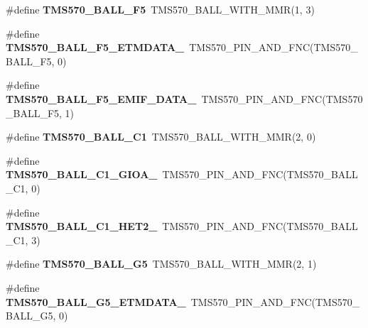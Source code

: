 \begin{DoxyCompactItemize}
\#define {\bfseries T\+M\+S570\+\_\+\+B\+A\+L\+L\+\_\+\+F5}~T\+M\+S570\+\_\+\+B\+A\+L\+L\+\_\+\+W\+I\+T\+H\+\_\+\+M\+MR(1, 3)
\item 
\mbox{\label{tms570ls3137zwt-pins_8h_a7a4157873929e40b849c076693bb7411}} 
\#define {\bfseries T\+M\+S570\+\_\+\+B\+A\+L\+L\+\_\+\+F5\+\_\+\+E\+T\+M\+D\+A\+T\+A\+\_}~T\+M\+S570\+\_\+\+P\+I\+N\+\_\+\+A\+N\+D\+\_\+\+F\+NC(T\+M\+S570\+\_\+\+B\+A\+L\+L\+\_\+\+F5, 0)
\item 
\mbox{\label{tms570ls3137zwt-pins_8h_a11a0775932905eaeb8c8e3eaf5fbbd63}} 
\#define {\bfseries T\+M\+S570\+\_\+\+B\+A\+L\+L\+\_\+\+F5\+\_\+\+E\+M\+I\+F\+\_\+\+D\+A\+T\+A\+\_}~T\+M\+S570\+\_\+\+P\+I\+N\+\_\+\+A\+N\+D\+\_\+\+F\+NC(T\+M\+S570\+\_\+\+B\+A\+L\+L\+\_\+\+F5, 1)
\item 
\mbox{\label{tms570ls3137zwt-pins_8h_a376d17ae50601f9d94280e0364a7deae}} 
\#define {\bfseries T\+M\+S570\+\_\+\+B\+A\+L\+L\+\_\+\+C1}~T\+M\+S570\+\_\+\+B\+A\+L\+L\+\_\+\+W\+I\+T\+H\+\_\+\+M\+MR(2, 0)
\item 
\mbox{\label{tms570ls3137zwt-pins_8h_aafb87e7558eedd0e150a61e12b34c777}} 
\#define {\bfseries T\+M\+S570\+\_\+\+B\+A\+L\+L\+\_\+\+C1\+\_\+\+G\+I\+O\+A\+\_}~T\+M\+S570\+\_\+\+P\+I\+N\+\_\+\+A\+N\+D\+\_\+\+F\+NC(T\+M\+S570\+\_\+\+B\+A\+L\+L\+\_\+\+C1, 0)
\item 
\mbox{\label{tms570ls3137zwt-pins_8h_aee37a779c5ef778dbb1893af6a0511c3}} 
\#define {\bfseries T\+M\+S570\+\_\+\+B\+A\+L\+L\+\_\+\+C1\+\_\+\+H\+E\+T2\+\_}~T\+M\+S570\+\_\+\+P\+I\+N\+\_\+\+A\+N\+D\+\_\+\+F\+NC(T\+M\+S570\+\_\+\+B\+A\+L\+L\+\_\+\+C1, 3)
\item 
\mbox{\label{tms570ls3137zwt-pins_8h_aa807257fad8648aa995a450521f50448}} 
\#define {\bfseries T\+M\+S570\+\_\+\+B\+A\+L\+L\+\_\+\+G5}~T\+M\+S570\+\_\+\+B\+A\+L\+L\+\_\+\+W\+I\+T\+H\+\_\+\+M\+MR(2, 1)
\item 
\mbox{\label{tms570ls3137zwt-pins_8h_abfff88d10497a39688738be1507a4797}} 
\#define {\bfseries T\+M\+S570\+\_\+\+B\+A\+L\+L\+\_\+\+G5\+\_\+\+E\+T\+M\+D\+A\+T\+A\+\_}~T\+M\+S570\+\_\+\+P\+I\+N\+\_\+\+A\+N\+D\+\_\+\+F\+NC(T\+M\+S570\+\_\+\+B\+A\+L\+L\+\_\+\+G5, 0)

\end{DoxyCompactItemize}
